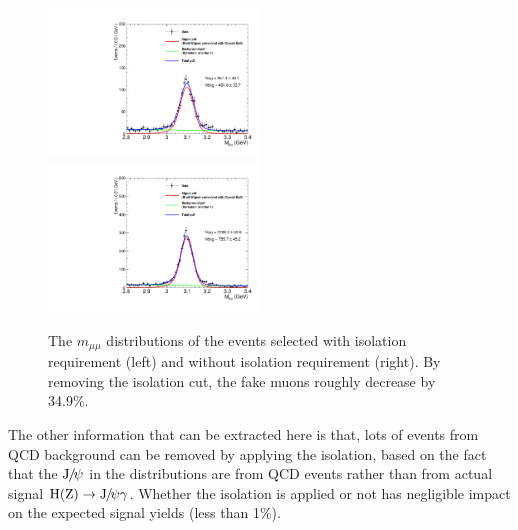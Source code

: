 	\begin{figure}[!ht]
		  \centering
		  \includegraphics[width=0.5\textwidth]{Fig/FakeMuEst/Dimuon_Nominal}~
		  \includegraphics[width=0.5\textwidth]{Fig/FakeMuEst/Dimuon_NoIso}\\
		  \caption{The $m_{\mu\mu}$ distributions of the events selected with isolation requirement (left) and without isolation requirement (right). By removing the isolation cut, the fake muons roughly decrease by 34.9\%.}
		  \label{fig:FakeMuEst}
		\end{figure}	
		
		The other information that can be extracted here is that, lots of events from QCD background can be removed by applying the isolation, based on the fact that the ${\mathrm{J}\hspace{-.08em}/\hspace{-.14em}\psi}$ in the distributions are from QCD events rather than from actual signal $\mathrm{H} (\mathrm{Z})\to{\mathrm{J}\hspace{-.08em}/\hspace{-.14em}\psi}\gamma$. Whether the isolation is applied or not has negligible impact on the expected signal yields (less than 1\%).
		
